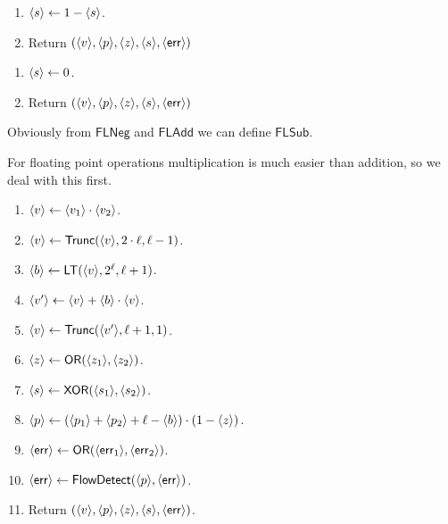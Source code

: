 \begin{enumerate}
\item $\langle s \rangle \leftarrow 1-\langle s \rangle$.
\item Return $(\langle v \rangle,\langle p \rangle,\langle z \rangle,\langle s \rangle,\langle \mathsf{err} \rangle)$
\end{enumerate}

\begin{enumerate}
\item $\langle s \rangle \leftarrow 0$.
\item Return $(\langle v \rangle,\langle p \rangle,\langle z \rangle,\langle s \rangle,\langle \mathsf{err} \rangle)$
\end{enumerate}
Obviously from $\mathsf{FLNeg}$ and $\mathsf{FLAdd}$ we can define $\mathsf{FLSub}$.

For floating point operations multiplication is much easier than addition, so we deal with 
this first.
\begin{enumerate}
\item $\langle v \rangle \leftarrow \langle v_1 \rangle \cdot \langle v_2 \rangle$.
\item $\langle v \rangle \leftarrow \mathsf{Trunc}(\langle v \rangle,2 \cdot \ell, \ell-1)$.
\item $\langle b \rangle \leftarrow \mathsf{LT}(\langle v \rangle,2^\ell,\ell+1)$.
\item $\langle v' \rangle \leftarrow \langle v \rangle+\langle b \rangle \cdot \langle v \rangle$.
\item $\langle v \rangle \leftarrow \mathsf{Trunc}(\langle v' \rangle, \ell+1, 1)$.
\item $\langle z \rangle \leftarrow \mathsf{OR}(\langle z_1 \rangle,\langle z_2 \rangle)$.
\item $\langle s \rangle \leftarrow \mathsf{XOR}(\langle s_1 \rangle,\langle s_2 \rangle)$.
\item $\langle p \rangle \leftarrow (\langle p_1 \rangle+\langle p_2 \rangle+\ell-\langle b \rangle) \cdot (1-\langle z \rangle)$.
\item $\langle \mathsf{err} \rangle \leftarrow \mathsf{OR}(\langle \mathsf{err}_1 \rangle,\langle \mathsf{err}_2 \rangle)$.
\item $\langle \mathsf{err} \rangle \leftarrow \mathsf{FlowDetect}(\langle p \rangle,\langle \mathsf{err} \rangle)$.
\item Return $(\langle v \rangle,\langle p \rangle,\langle z \rangle,\langle s \rangle,\langle \mathsf{err} \rangle)$.
\end{enumerate}


